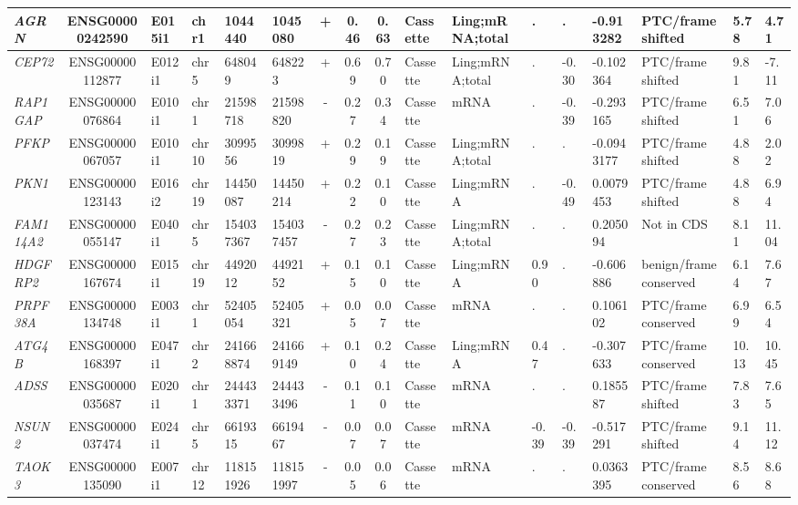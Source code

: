 \begin{landscape}
\begin{table}
{\begin{tabular}{|l|c|l|l|l|l|c|c|c|l|l|l|l|l|l|l|l|}
		\textit{AGRN} & ENSG00000242590 & E015i1 & chr1  & 1044440 & 1045080 & +     & 0.46  & 0.63  & Cassette & Ling;mRNA;total & . & . & -0.913282 & PTC/frame shifted & 5.78  &  4.71 \\ \hline
\textit{CEP72} & ENSG00000112877 & E012i1 & chr5  & 648049 & 648223 & +     & 0.69  & 0.70  & Cassette & Ling;mRNA;total & . & -0.30 & -0.102364 & PTC/frame shifted & 9.81  &  -7.11 \\ \hline
\textit{RAP1GAP} & ENSG00000076864 & E010i1 & chr1  & 21598718 & 21598820 & -     & 0.27  & 0.34  & Cassette & mRNA  & . & -0.39 & -0.293165 & PTC/frame shifted & 6.51  &  7.06 \\ \hline
\textit{PFKP} & ENSG00000067057 & E010i1 & chr10 & 3099556 & 3099819 & +     & 0.29  & 0.19  & Cassette & Ling;mRNA;total & . & . & -0.0943177 & PTC/frame shifted & 4.88  &  2.02 \\ \hline
\textit{PKN1} & ENSG00000123143 & E016i2 & chr19 & 14450087 & 14450214 & +     & 0.22  & 0.10  & Cassette & Ling;mRNA & . & -0.49 & 0.0079453 & PTC/frame shifted & 4.88  &  6.94 \\ \hline
\textit{FAM114A2} & ENSG00000055147 & E040i1 & chr5  & 154037367 & 154037457 & -     & 0.27  & 0.23  & Cassette & Ling;mRNA;total & . & . & 0.205094 & Not in CDS & 8.11  &  11.04 \\ \hline
\textit{HDGFRP2} & ENSG00000167674 & E015i1 & chr19 & 4492012 & 4492152 & +     & 0.15  & 0.10  & Cassette & Ling;mRNA & 0.90  & . & -0.606886 & benign/frame conserved & 6.14  &  7.67 \\ \hline
\textit{PRPF38A} & ENSG00000134748 & E003i1 & chr1  & 52405054 & 52405321 & +     & 0.05  & 0.07  & Cassette & mRNA  & . & . & 0.106102 & PTC/frame conserved & 6.99  &  6.54 \\ \hline
\textit{ATG4B} & ENSG00000168397 & E047i1 & chr2  & 241668874 & 241669149 & +     & 0.10  & 0.24  & Cassette & Ling;mRNA & 0.47  & . & -0.307633 & PTC/frame conserved & 10.13 &  10.45 \\ \hline
\textit{ADSS} & ENSG00000035687 & E020i1 & chr1  & 244433371 & 244433496 & -     & 0.11  & 0.10  & Cassette & mRNA  & . & . & 0.185587 & PTC/frame shifted & 7.83  &  7.65 \\ \hline
\textit{NSUN2} & ENSG00000037474 & E024i1 & chr5  & 6619315 & 6619467 & -     & 0.07  & 0.07  & Cassette & mRNA  & -0.39 & -0.39 & -0.517291 & PTC/frame shifted & 9.14  &  11.12 \\ \hline		
		\textit{TAOK3} & ENSG00000135090 & E007i1 & chr12 & 118151926 & 118151997 & -     & 0.05  & 0.06  & Cassette & mRNA  & . & . & 0.0363395 & PTC/frame conserved & 8.56  &  8.68 \\ \hline

\end{tabular}}
\end{table}
\end{landscape}
